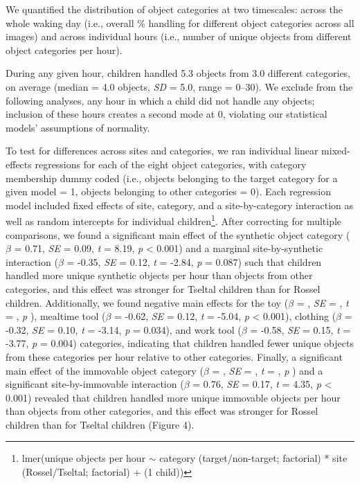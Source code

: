 \documentclass[10pt, letterpaper]{article}
\begin{document}
We quantified the distribution of object categories at two timescales:
across the whole waking day (i.e., overall \% handling for different
object categories across all images) and across individual hours (i.e.,
number of unique objects from different object categories per hour).

During any given hour, children handled 5.3 objects from 3.0 different
categories, on average (median = 4.0 objects, \emph{SD} = 5.0, range =
0--30). We exclude from the following analyses, any hour in which a
child did not handle any objects; inclusion of these hours creates a
second mode at 0, violating our statistical models' assumptions of
normality.

To test for differences across sites and categories, we ran individual
linear mixed-effects regressions for each of the eight object
categories, with category membership dummy coded (i.e., objects
belonging to the target category for a given model = 1, objects
belonging to other categories = 0). Each regression model included fixed
effects of site, category, and a site-by-category interaction as well as
random intercepts for individual children\footnote{lmer(unique objects
  per hour \({\sim}\) category (target/non-target; factorial) * site
  (Rossel/Tseltal; factorial) + (1 \textbar{} child))}. After correcting
for multiple comparisons, we found a significant main effect of the
synthetic object category (\(\beta\) = 0.71, \emph{SE} = 0.09, \emph{t}
= 8.19, \emph{p} \textless{} 0.001) and a marginal site-by-synthetic
interaction (\(\beta\) = -0.35, \emph{SE} = 0.12, \emph{t} = -2.84,
\emph{p} = 0.087) such that children handled more unique synthetic
objects per hour than objects from other categories, and this effect was
stronger for Tseltal children than for Rossel children. Additionally, we
found negative main effects for the toy (\(\beta\) = , \emph{SE} = ,
\emph{t} = , \emph{p} ), mealtime tool (\(\beta\) = -0.62, \emph{SE} =
0.12, \emph{t} = -5.04, \emph{p} \textless{} 0.001), clothing (\(\beta\)
= -0.32, \emph{SE} = 0.10, \emph{t} = -3.14, \emph{p} = 0.034), and work
tool (\(\beta\) = -0.58, \emph{SE} = 0.15, \emph{t} = -3.77, \emph{p} =
0.004) categories, indicating that children handled fewer unique objects
from these categories per hour relative to other categories. Finally, a
significant main effect of the immovable object category (\(\beta\) = ,
\emph{SE} = , \emph{t} = , \emph{p} ) and a significant
site-by-immovable interaction (\(\beta\) = 0.76, \emph{SE} = 0.17,
\emph{t} = 4.35, \emph{p} \textless{} 0.001) revealed that children
handled more unique immovable objects per hour than objects from other
categories, and this effect was stronger for Rossel children than for
Tseltal children (Figure 4).
\end{document}
